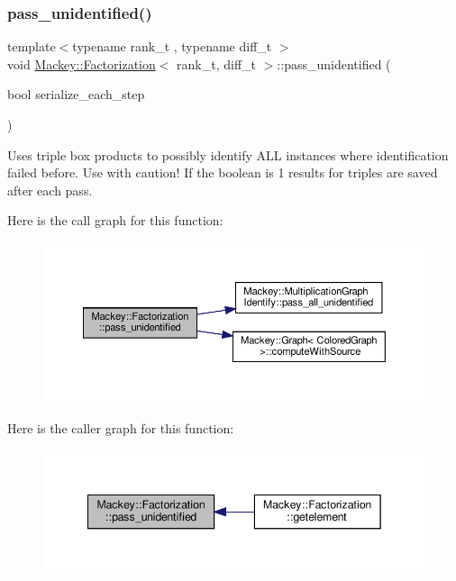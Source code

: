 \subsubsection{\texorpdfstring{pass\+\_\+unidentified()}{pass\_unidentified()}}
{\footnotesize\ttfamily template$<$typename rank\+\_\+t , typename diff\+\_\+t $>$ \\
void \hyperlink{classMackey_1_1Factorization}{Mackey\+::\+Factorization}$<$ rank\+\_\+t, diff\+\_\+t $>$\+::pass\+\_\+unidentified (\begin{DoxyParamCaption}\item[{bool}]{serialize\+\_\+each\+\_\+step }\end{DoxyParamCaption})}



Uses triple box products to possibly identify A\+LL instances where identification failed before. Use with caution! If the boolean is 1 results for triples are saved after each pass. 

Here is the call graph for this function\+:\nopagebreak
\begin{figure}[H]
\begin{center}
\leavevmode
\includegraphics[width=350pt]{classMackey_1_1Factorization_a3302694fa01f5fe9182b18be30e0411d_cgraph}
\end{center}
\end{figure}
Here is the caller graph for this function\+:\nopagebreak
\begin{figure}[H]
\begin{center}
\leavevmode
\includegraphics[width=342pt]{classMackey_1_1Factorization_a3302694fa01f5fe9182b18be30e0411d_icgraph}
\end{center}
\end{figure}


